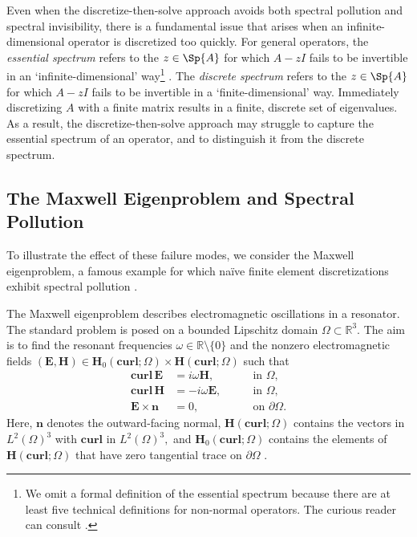 Even when the discretize-then-solve approach avoids both spectral pollution and spectral invisibility, there is a fundamental issue that arises when an infinite-dimensional operator is discretized too quickly. For general operators, the \textit{essential spectrum} refers to the $z \in \Sp{A}$ for which $A-zI$ fails to be invertible in an `infinite-dimensional' way\footnote{We omit a formal definition of the essential spectrum because there are at least five technical definitions for non-normal operators. The curious reader can consult \cite[Ch. 8]{Matt}.} \cite{Matt}. The \textit{discrete spectrum} refers to the $z \in \Sp{A}$ for which $A-zI$ fails to be invertible in a `finite-dimensional' way. 
Immediately discretizing $A$ with a finite matrix results in a finite, discrete set of eigenvalues. As a result, the discretize-then-solve approach may struggle to capture the essential spectrum of an operator, and to distinguish it from the discrete spectrum.  

\subsection{The Maxwell Eigenproblem and Spectral Pollution}\label{Maxwell Sect}


To illustrate the effect of these failure modes, we consider the Maxwell eigenproblem, a famous example for which na\"{i}ve finite element discretizations exhibit spectral pollution \cite{Boffi}. 

The Maxwell eigenproblem describes electromagnetic oscillations in a resonator. The standard problem is posed on a bounded Lipschitz domain $\Omega \subset \mathbb{R}^3.$ The aim is to find the resonant frequencies $\omega \in \mathbb{R}\setminus\{0\}$ and the nonzero electromagnetic fields $(\mathbf{E}, \mathbf{H}) \in \mathbf{H}_0(\textbf{curl};\Omega) \times \mathbf{H}(\textbf{curl};\Omega)$ such that
\begin{subequations}\label{3D Max}
\begin{align}
    \textbf{curl} \, \mathbf{E} &= i \omega \mathbf{H}, \qquad &\text{in } \Omega,\label{eq:system-a}\\
    \textbf{curl} \, \mathbf{H} &= -i \omega \mathbf{E}, \qquad &\text{in } \Omega,\label{eq:system-b}\\
    \mathbf{E} \times \mathbf{n} &= 0, \qquad &\text{on } \partial \Omega. \label{eq:system-c}
\end{align}
\end{subequations}
Here, $\mathbf{n}$ denotes the outward-facing normal, $\mathbf{H}(\textbf{curl};\Omega)$ contains the vectors in $L^2(\Omega)^3$ with $\mathbf{curl}$ in $L^2(\Omega)^3,$ and $\mathbf{H}_0(\textbf{curl};\Omega)$ contains the elements of $\mathbf{H}(\textbf{curl};\Omega)$ that have zero tangential trace on $\partial \Omega$ \cite{Matt}.

